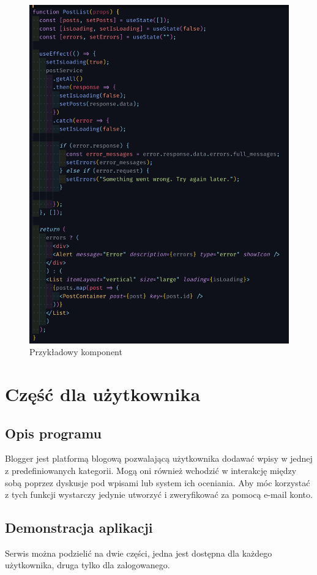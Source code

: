 \documentclass[declaration,shortabstract]{iithesis}
\begin{document}
\begin{figure}
    \centering
    \includegraphics[width=\textwidth]{images/komponent1.png}
    \caption{Przykładowy komponent}
    \label{fig:komponent1}
\end{figure}

\chapter{Część dla użytkownika}
\section{Opis programu}
Blogger jest platformą blogową pozwalającą użytkownika dodawać wpisy w jednej z predefiniowanych kategorii. Mogą oni również wchodzić w interakcję między sobą poprzez dyskusje pod wpisami lub system ich oceniania. Aby móc korzystać z tych funkcji wystarczy jedynie utworzyć i zweryfikować za pomocą e-mail konto.
\section{Demonstracja aplikacji}
Serwis można podzielić na dwie części, jedna jest dostępna dla każdego użytkownika, druga tylko dla zalogowanego.
\end{document}
